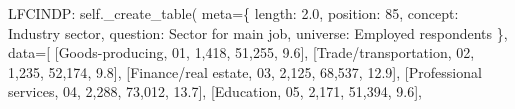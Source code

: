 \documentclass[
  11pt,
  a4paper,
]{article}
\newenvironment{Shaded}{\begin{snugshade}}{\end{snugshade}}
\newcommand{\NormalTok}[1]{\textcolor[rgb]{0.00,0.23,0.31}{#1}}
\newcommand{\OperatorTok}[1]{\textcolor[rgb]{0.37,0.37,0.37}{#1}}
\newcommand{\StringTok}[1]{\textcolor[rgb]{0.13,0.47,0.30}{#1}}
\newcommand{\VariableTok}[1]{\textcolor[rgb]{0.07,0.07,0.07}{#1}}
\begin{document}
\begin{Shaded}
\begin{Highlighting}[]
            \StringTok{\textquotesingle{}LFCINDP\textquotesingle{}}\NormalTok{: }\VariableTok{self}\NormalTok{.\_create\_table(}
\NormalTok{                meta}\OperatorTok{=}\NormalTok{\{}
                    \StringTok{\textquotesingle{}length\textquotesingle{}}\NormalTok{: }\StringTok{\textquotesingle{}2.0\textquotesingle{}}\NormalTok{, }\StringTok{\textquotesingle{}position\textquotesingle{}}\NormalTok{: }\StringTok{\textquotesingle{}85\textquotesingle{}}\NormalTok{,}
                    \StringTok{\textquotesingle{}concept\textquotesingle{}}\NormalTok{: }\StringTok{\textquotesingle{}Industry sector\textquotesingle{}}\NormalTok{,}
                    \StringTok{\textquotesingle{}question\textquotesingle{}}\NormalTok{: }\StringTok{\textquotesingle{}Sector for main job\textquotesingle{}}\NormalTok{,}
                    \StringTok{\textquotesingle{}universe\textquotesingle{}}\NormalTok{: }\StringTok{\textquotesingle{}Employed respondents\textquotesingle{}}
\NormalTok{                \},}
\NormalTok{                data}\OperatorTok{=}\NormalTok{[}
\NormalTok{                    [}\StringTok{\textquotesingle{}Goods{-}producing\textquotesingle{}}\NormalTok{, }\StringTok{\textquotesingle{}01\textquotesingle{}}\NormalTok{, }\StringTok{\textquotesingle{}1,418\textquotesingle{}}\NormalTok{, }\StringTok{\textquotesingle{}51,255\textquotesingle{}}\NormalTok{, }\StringTok{\textquotesingle{}9.6\textquotesingle{}}\NormalTok{],}
\NormalTok{                    [}\StringTok{\textquotesingle{}Trade/transportation\textquotesingle{}}\NormalTok{, }\StringTok{\textquotesingle{}02\textquotesingle{}}\NormalTok{, }\StringTok{\textquotesingle{}1,235\textquotesingle{}}\NormalTok{, }\StringTok{\textquotesingle{}52,174\textquotesingle{}}\NormalTok{, }\StringTok{\textquotesingle{}9.8\textquotesingle{}}\NormalTok{],}
\NormalTok{                    [}\StringTok{\textquotesingle{}Finance/real estate\textquotesingle{}}\NormalTok{, }\StringTok{\textquotesingle{}03\textquotesingle{}}\NormalTok{, }\StringTok{\textquotesingle{}2,125\textquotesingle{}}\NormalTok{, }\StringTok{\textquotesingle{}68,537\textquotesingle{}}\NormalTok{, }\StringTok{\textquotesingle{}12.9\textquotesingle{}}\NormalTok{],}
\NormalTok{                    [}\StringTok{\textquotesingle{}Professional services\textquotesingle{}}\NormalTok{, }\StringTok{\textquotesingle{}04\textquotesingle{}}\NormalTok{, }\StringTok{\textquotesingle{}2,288\textquotesingle{}}\NormalTok{, }\StringTok{\textquotesingle{}73,012\textquotesingle{}}\NormalTok{, }\StringTok{\textquotesingle{}13.7\textquotesingle{}}\NormalTok{],}
\NormalTok{                    [}\StringTok{\textquotesingle{}Education\textquotesingle{}}\NormalTok{, }\StringTok{\textquotesingle{}05\textquotesingle{}}\NormalTok{, }\StringTok{\textquotesingle{}2,171\textquotesingle{}}\NormalTok{, }\StringTok{\textquotesingle{}51,394\textquotesingle{}}\NormalTok{, }\StringTok{\textquotesingle{}9.6\textquotesingle{}}\NormalTok{],}

\end{Highlighting}
\end{Shaded}
\end{document}
